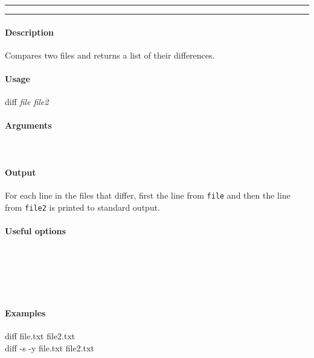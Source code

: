 \hrule
\vspace{1mm}
\hrule
\vspace{4mm}

\paragraph{Description}
\indentpar \raggedright \textrm{Compares two files and returns a list of their differences.}\\

\paragraph{Usage}
\indentpar diff \textit{file file2}

\paragraph{Arguments}
\indentpar {}\\
\indentpar {}

\paragraph{Output}
\indentpar \textrm{For each line in the files that differ, first the line from \texttt{file} and then the line from \texttt{file2} is printed to standard output.}

\paragraph{Useful options}
\indentpar {}\\
\indentpar {}\\
\indentpar {}\\
\indentpar {}\\
\indentpar {}


\paragraph{Examples}

\indentpar diff file.txt file2.txt\\
\indentpar diff -s -y file.txt file2.txt

\vspace{20mm}